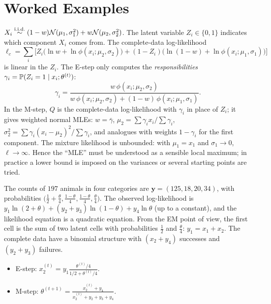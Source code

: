 \documentclass[main.tex]{subfiles}
\begin{document}
\section{Worked Examples}

\begin{example}\label{ex:em-karisim}
$X_i\iid(1-w)\Normal(\mu_1,\sigma_1^2)+w\Normal(\mu_2,\sigma_2^2)$. The latent variable $Z_i\in\{0,1\}$ indicates which component $X_i$ comes from. The complete-data log-likelihood
\[
\ell_c=\sum_i\Big[Z_i\big(\ln w+\ln\phi(x_i;\mu_2,\sigma_2)\big)+(1-Z_i)\big(\ln(1-w)+\ln\phi(x_i;\mu_1,\sigma_1)\big)\Big]
\]
is linear in the $Z_i$. The E-step only computes the \emph{responsibilities} $\gamma_i=\P(Z_i=1\mid x_i;\theta^{(t)})$:
\[
\gamma_i=\frac{w\,\phi(x_i;\mu_2,\sigma_2)}{w\,\phi(x_i;\mu_2,\sigma_2)+(1-w)\,\phi(x_i;\mu_1,\sigma_1)} .
\]
In the M-step, $Q$ is the complete-data log-likelihood with $\gamma_i$ in place of $Z_i$; it gives weighted normal MLEs: $w=\bar\gamma$, $\mu_2=\sum\gamma_ix_i/\sum\gamma_i$, $\sigma_2^2=\sum\gamma_i(x_i-\mu_2)^2/\sum\gamma_i$, and analogues with weights $1-\gamma_i$ for the first component. The mixture likelihood is unbounded: with $\mu_1=x_1$ and $\sigma_1\to0$, $\ell\to\infty$. Hence the ``MLE'' must be understood as a sensible local maximum; in practice a lower bound is imposed on the variances or several starting points are tried.
\end{example}

\begin{example}\label{ex:baglanti}
The counts of $197$ animals in four categories are $\mathbf y=(125,18,20,34)$, with probabilities $\big(\frac12+\frac\theta4,\frac{1-\theta}4,\frac{1-\theta}4,\frac\theta4\big)$. The observed log-likelihood is $y_1\ln(2+\theta)+(y_2+y_3)\ln(1-\theta)+y_4\ln\theta$ (up to a constant), and the likelihood equation is a quadratic equation. From the EM point of view, the first cell is the sum of two latent cells with probabilities $\frac12$ and $\frac\theta4$: $y_1=x_1+x_2$. The complete data have a binomial structure with $(x_2+y_4)$ successes and $(y_2+y_3)$ failures.
\begin{itemize}
  \item E-step: $x_2^{(t)}=y_1\frac{\theta^{(t)}/4}{1/2+\theta^{(t)}/4}$.
  \item M-step: $\theta^{(t+1)}=\frac{x_2^{(t)}+y_4}{x_2^{(t)}+y_2+y_3+y_4}$.
\end{itemize}
\end{example}
\end{document}
